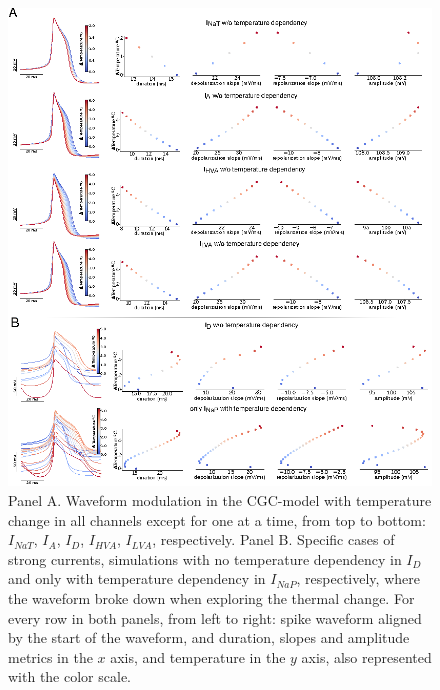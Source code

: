 \begin{figure}[hbt!]
    \centering
    \includegraphics[width=\textwidth]{img/laser/Q10_parameter_no_dependency_v2.eps}
    \caption{ Panel A. Waveform modulation in the CGC-model with temperature change in all channels except for one at a time, from top to bottom: $I_{NaT}$, $I_{A}$, $I_{D}$, $I_{HVA}$, $I_{LVA}$, respectively. Panel B. Specific cases of strong currents, simulations with no temperature dependency in $I_D$ and only with temperature dependency in $I_{NaP}$, respectively, where the waveform broke down when exploring the thermal change. For every row in both panels, from left to right: spike waveform aligned by the start of the waveform, and duration, slopes and amplitude metrics in the $x$ axis, and temperature in the $y$ axis, also represented with the color scale.}
    \label{fig:q10 dependency}
\end{figure}

